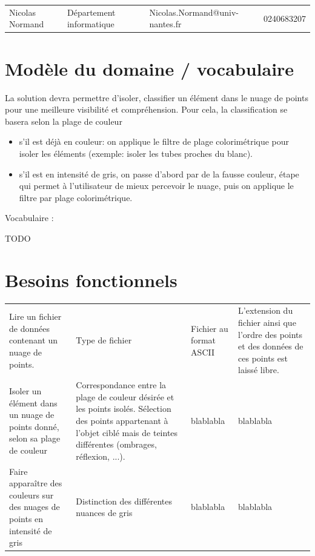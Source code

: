 \documentclass[12pt,titlepage,french]{article}
\begin{document}
\noindent\begin{tabu} to \textwidth {X[c2]X[c2]X[c3]X[c]}\toprule
     &&                       &\\\toprule
Nicolas Normand& Département informatique&Nicolas.Normand@univ-nantes.fr&    0240683207\\\bottomrule
\end{tabu}

\section{Modèle du domaine / vocabulaire}

La solution devra permettre d’isoler, classifier un élément dans le nuage de points pour une meilleure visibilité et compréhension. Pour cela, la classification se basera selon la plage de couleur
\begin{itemize}
	\item  s'il est déjà en couleur: on applique le filtre de plage colorimétrique pour isoler les éléments (exemple: isoler les tubes proches du blanc).\par

	\item  s'il est en intensité de gris, on passe d'abord par de la fausse couleur, étape qui permet à l'utilisateur de mieux percevoir le nuage, puis on applique le filtre par plage colorimétrique.\par

\end{itemize}

Vocabulaire :

TODO

\section{Besoins fonctionnels}

\noindent\begin{tabu} to \textwidth {X[c2]X[c]X[c]X[c3]}\toprule
{}&
&                       
&
\\\toprule
Lire un fichier de données contenant un nuage de points. 
& Type de fichier 
& Fichier au format ASCII
& L'extension du fichier ainsi que l'ordre des points et des données de ces points est laissé libre. \\\midrule
Isoler un élément dans un nuage de points donné, selon sa plage de couleur 
& Correspondance entre la plage de couleur désirée et les points isolés.
Sélection des points appartenant à l'objet ciblé mais de teintes différentes (ombrages, réflexion, ...).
& blablabla
& blablabla\\\midrule
Faire apparaître des couleurs sur des nuages de points en intensité de gris
& Distinction des différentes nuances de gris
& blablabla
& blablabla\\\bottomrule

\end{tabu}
\end{document}
